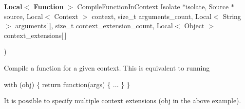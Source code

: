 {\begin{DoxyParamCaption}
\item[{{\bf Local}$<$ {\bf Function} $>$ }]{Compile\+Function\+In\+Context                                                                                                                                                                                                                                   Isolate $\ast$isolate, Source $\ast$source,                                                                                                                                                                                                                                   Local$<$ Context $>$ context, size\+\_\+t arguments\+\_\+count,                                                                                                                                                                                                                                   Local$<$ String $>$ arguments\mbox{[}$\,$\mbox{]},                                                                                                                                                                                                                                   size\+\_\+t context\+\_\+extension\+\_\+count,                                                                                                                                                                                                                                   Local$<$ Object $>$ context\+\_\+extensions\mbox{[}$\,$\mbox{]}}
\end{DoxyParamCaption}
)\hspace{0.3cm}{\ttfamily [static]}}\hypertarget{classv8_1_1ScriptCompiler_a94eb1a7257e9bf4c2f15cb7a14887d05}{}\label{classv8_1_1ScriptCompiler_a94eb1a7257e9bf4c2f15cb7a14887d05}
Compile a function for a given context. This is equivalent to running

with (obj) \{ return function(args) \{ ... \} \}

It is possible to specify multiple context extensions (obj in the above example). 
